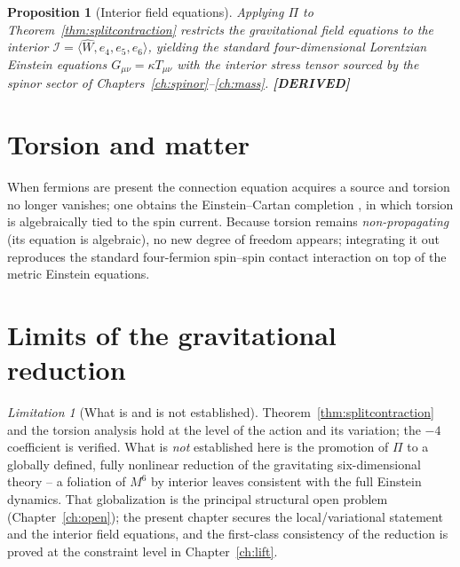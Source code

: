 \documentclass[11pt,oneside]{book}
\newcommand{\Wh}{\hat{W}}                         %
\newcommand{\status}[1]{{\sffamily\bfseries\color{statuscol}[#1]}}
\theoremstyle{plain}
\newtheorem{proposition}[theorem]{Proposition}
\theoremstyle{definition}
\theoremstyle{remark}
\newtheorem{limitation}[theorem]{Limitation}
\begin{document}
\begin{proposition}[Interior field equations]
\label{prop:interior-einstein}
Applying $\Pi$ to Theorem~\ref{thm:splitcontraction} restricts the gravitational
field equations to the interior $\mathcal I=\langle\Wh,e_4,e_5,e_6\rangle$,
yielding the standard four-dimensional Lorentzian Einstein equations
$G_{\mu\nu}=\kappa T_{\mu\nu}$ with the interior stress tensor sourced by the
spinor sector of Chapters~\ref{ch:spinor}--\ref{ch:mass}. \status{DERIVED}
\end{proposition}

\section{Torsion and matter}
\label{sec:torsion}

When fermions are present the connection equation acquires a source and torsion no
longer vanishes; one obtains the Einstein--Cartan completion
\cite{Kibble1961,Sciama1964,HehlEtAl1976}, in which torsion is algebraically tied to
the spin current. Because torsion remains \emph{non-propagating} (its equation is
algebraic), no new degree of freedom appears; integrating it out reproduces the
standard four-fermion spin--spin contact interaction on top of the metric Einstein
equations.

\section{Limits of the gravitational reduction}
\label{sec:gravity-limits}

\begin{limitation}[What is and is not established]
\label{lim:gravity}
Theorem~\ref{thm:splitcontraction} and the torsion analysis hold at the level of
the action and its variation; the $-4$ coefficient is verified. What is \emph{not}
established here is the promotion of $\Pi$ to a globally defined, fully nonlinear
reduction of the gravitating six-dimensional theory -- a foliation of $M^6$ by
interior leaves consistent with the full Einstein dynamics. That globalization is
the principal structural open problem (Chapter~\ref{ch:open}); the present chapter
secures the local/variational statement and the interior field equations, and the
first-class consistency of the reduction is proved at the constraint level in
Chapter~\ref{ch:lift}.
\end{limitation}
\end{document}
